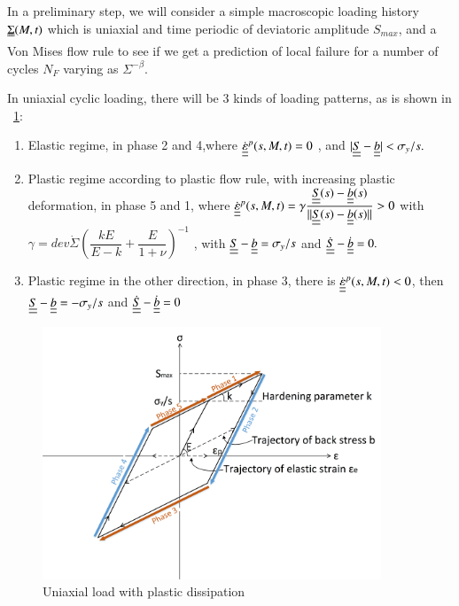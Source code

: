\documentclass[3p,times,number,review]{elsarticle}
\newcommand{\figref}[1]{\figurename~\ref{#1}}
\begin{document}
In a preliminary step, we will consider a simple macroscopic loading history $\uuline{\Sigma}(M, t)$ which is uniaxial
and time periodic of deviatoric amplitude $S_{max}$, and a Von Mises flow rule to see if we get a prediction of local failure for a number of cycles $N_F$ varying as $\Sigma^{-\beta}.$


\noindent
In uniaxial cyclic loading, there will be 3 kinds of loading patterns, as is shown in \figref{backstress}:

\vspace{6pt}
\begin{enumerate}
	
	\item	Elastic regime, in phase 2 and 4,where $\dot{\uline{\uline{\varepsilon}}}^p(s,M,t)=0$ ,  and $|\uline{\uline{S}}-\uline{\uline{b}}|< \sigma_y/s. $ 
	\vspace{6pt}
	
	\item Plastic regime according to plastic flow rule, with increasing plastic deformation, in phase 5 and 1, where	$\dot{\uline{\uline{\varepsilon}}}^p(s,M,t)=\gamma\dfrac{\uline{\uline{S}}(s)-\uline{\uline{b}}(s)}{||\uline{\uline{S}}(s)-\uline{\uline{b}}(s)||}> 0$ with  $\gamma= dev\dot{\Sigma}\left(\dfrac{kE}{E-k}+\dfrac{E}{1+\nu} \right) ^{-1}$ ,  with $\uline{\uline{S}}-\uline{\uline{b}}= \sigma_y/s$ and $\dot{\uline{\uline{S}}}-\dot{\uline{\uline{b}}}=0.$ 
	\vspace{6pt}
	
	\item Plastic regime in the other direction, in phase 3, there is	$\dot{\uline{\uline{\varepsilon}}}^p(s,M,t)<0$,  then $\uline{\uline{S}}-\uline{\uline{b}}=- \sigma_y/s$ and $\dot{\uline{\uline{S}}}-\dot{\uline{\uline{b}}}=0$ 
	
\end{enumerate}	

\begin{figure}[!h]
	\centering
	\includegraphics[width=0.9\textwidth]{figures//backstress.png} 
	\caption{Uniaxial load with plastic dissipation}
	\label{backstress}
\end{figure}
\end{document}
